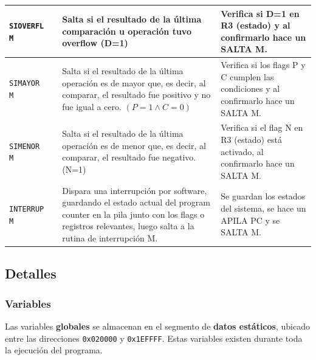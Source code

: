 \documentclass{article}
\begin{document}
\begin{longtable}{|p{}|p{}|p{}|p{}|}
  \hline
  \texttt{SIOVERFL M}  &  & Salta si el resultado de la última comparación u operación tuvo overflow (D=1)                                                                                                            & Verifica si D=1 en R3 (estado) y al confirmarlo hace un SALTA M.                                                       \\
  \hline
  \texttt{SIMAYOR M}   &  & Salta si el resultado de la última operación es de mayor que, es decir, al comparar, el resultado fue positivo y no fue igual a cero. $(P = 1 \land C = 0)$                              & Verifica si los flags P y C cumplen las condiciones y al confirmarlo hace un SALTA M.                                 \\
  \hline
  \texttt{SIMENOR M}   &  & Salta si el resultado de la última operación es de menor que, es decir, al comparar, el resultado fue negativo. (N=1)                                                                    & Verifica si el flag N en R3 (estado) está activado, al confirmarlo hace un SALTA M.                                   \\
  \hline
  \texttt{INTERRUP M}  &  & Dispara una interrupción por software, guardando el estado actual del program counter en la pila junto con los flags o registros relevantes, luego salta a la rutina de interrupción M.  & Se guardan los estados del sistema, se hace un APILA PC y se SALTA M.                                                  \\
  \hline
\end{longtable}



\subsection{Detalles}

\subsubsection{Variables}

Las variables \textbf{globales} se almacenan en el segmento de
\textbf{datos estáticos}, ubicado entre las direcciones
\texttt{0x020000} y \texttt{0x1EFFFF}. Estas variables
existen durante toda la ejecución del programa.
\end{document}
